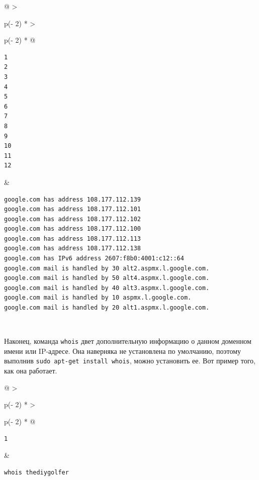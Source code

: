 \documentclass{report}
\begin{document}
\begin{longtable}[]{@{}
  >{\raggedright\arraybackslash}p{(\columnwidth - 2\tabcolsep) * }
  >{\raggedright\arraybackslash}p{(\columnwidth - 2\tabcolsep) * }@{}}
\toprule
\endhead
\begin{minipage}[t]{\linewidth}\raggedright
\begin{verbatim}
1
2
3
4
5
6
7
8
9
10
11
12
\end{verbatim}
\end{minipage} & \begin{minipage}[t]{\linewidth}\raggedright
\begin{verbatim}
google.com has address 108.177.112.139
google.com has address 108.177.112.101
google.com has address 108.177.112.102
google.com has address 108.177.112.100
google.com has address 108.177.112.113
google.com has address 108.177.112.138
google.com has IPv6 address 2607:f8b0:4001:c12::64
google.com mail is handled by 30 alt2.aspmx.l.google.com.
google.com mail is handled by 50 alt4.aspmx.l.google.com.
google.com mail is handled by 40 alt3.aspmx.l.google.com.
google.com mail is handled by 10 aspmx.l.google.com.
google.com mail is handled by 20 alt1.aspmx.l.google.com.
\end{verbatim}
\end{minipage} \\ \addlinespace
\bottomrule
\end{longtable}

Наконец, команда \texttt{whois} двет дополнительную информацию о данном
доменном имени или IP-адресе. Она наверняка не установлена по умолчанию,
поэтому выполнив \texttt{sudo\ apt-get\ install\ whois}, можно
установить ее. Вот пример того, как она работает.

\begin{longtable}[]{@{}
  >{\raggedright\arraybackslash}p{(\columnwidth - 2\tabcolsep) * }
  >{\raggedright\arraybackslash}p{(\columnwidth - 2\tabcolsep) * }@{}}
\toprule
\endhead
\begin{minipage}[t]{\linewidth}\raggedright
\begin{verbatim}
1
\end{verbatim}
\end{minipage} & \begin{minipage}[t]{\linewidth}\raggedright
\begin{verbatim}
whois thediygolfer
\end{verbatim}
\end{minipage} \\ \addlinespace
\bottomrule
\end{longtable}
\end{document}
